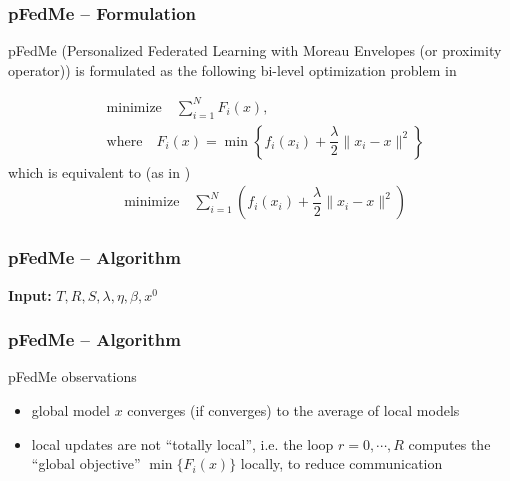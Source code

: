 
\begin{frame}
\frametitle{pFedMe -- Formulation}

pFedMe (Personalized Federated Learning with Moreau Envelopes (or proximity operator)) is formulated as the following bi-level optimization problem in \cite{t2020pfedme}

\begin{align*}
    & \text{minimize} \quad \sum\limits_{i=1}^N F_i(x), \\
    & \text{where} \quad F_i(x) = \min \left\{ f_i(x_i) + \dfrac{\lambda}{2} \lVert x_i - x \rVert^2 \right\}
\end{align*}
which is equivalent to (as in \cite{zhang2015easgd})
\begin{align*}
    & \text{minimize} \quad \sum\limits_{i=1}^N \left( f_i(x_i) + \dfrac{\lambda}{2} \lVert x_i - x \rVert^2 \right)
\end{align*}

\end{frame}


\begin{frame}
\frametitle{pFedMe -- Algorithm}

\begin{algorithm}[H]
\SetAlgoNoLine
\DontPrintSemicolon
{\bfseries Input:} $T,R,S,\lambda,\eta,\beta,x^0$\;
\caption{pFedMe\cite{t2020pfedme}}
\end{algorithm}

\end{frame}


\begin{frame}
\frametitle{pFedMe -- Algorithm}

\begin{block}{pFedMe observations}
\begin{itemize}
    \item global model $x$ converges (if converges) to the average of local models
    \item local updates are not ``totally local'', i.e. the loop $r = 0, \cdots, R$ computes the ``global objective'' $\min\{F_i(x)\}$ locally, to reduce communication
\end{itemize}
\end{block}

\end{frame}


